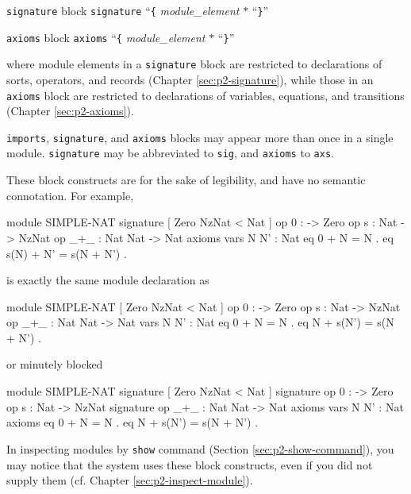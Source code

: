 \documentclass[a4paper]{memoir}
\begin{document}
\begin{bsyntax} \texttt{signature} block  \Hline
\texttt{signature} ``\texttt{\{} \textit{module\_element} $*$ ``\texttt{\}}''
\end{bsyntax}

\begin{bsyntax} \texttt{axioms} block  \Hline
\texttt{axioms} ``\texttt{\{} \textit{module\_element} $*$ ``\texttt{\}}''
\end{bsyntax}

where module elements in a \verb|signature| block
are restricted to declarations of sorts,
operators, and records (Chapter \ref{sec:p2-signature}),
while those in an \verb|axioms| block are restricted
to declarations of variables, equations, and transitions
(Chapter \ref{sec:p2-axioms}).

\verb|imports|,
\verb|signature|, and \verb|axioms| blocks may appear more than once in a
single module. \verb|signature| may be abbreviated to \verb|sig|, and
\verb|axioms| to \verb|axs|.

These block constructs are for the sake of
legibility, and have no semantic connotation. For example,
\label{exs:simple-nat}
\begin{vvtm}
\begin{ccode}
  module SIMPLE-NAT {
    signature {
      [ Zero NzNat < Nat ]
      op 0  : -> Zero
      op s : Nat -> NzNat 
      op _+_ : Nat Nat -> Nat
    }
    axioms {
      vars N N' : Nat
      eq 0 + N = N .
      eq s(N) + N' = s(N + N') .
    }  
  }
\end{ccode}
\end{vvtm}
is exactly the same module declaration as
\begin{vvtm}
\begin{ccode}
  module SIMPLE-NAT {
    [ Zero NzNat < Nat ]
    op 0  : -> Zero
    op s : Nat -> NzNat 
    op _+_ : Nat Nat -> Nat
    vars N N' : Nat
    eq 0 + N = N .
    eq N + s(N') = s(N + N') .
  }
\end{ccode}
\end{vvtm}
or minutely blocked
\begin{vvtm}
\begin{ccode}
    module SIMPLE-NAT {
    signature {
      [ Zero NzNat < Nat ]
    }
    signature {
      op 0  : -> Zero
      op s : Nat -> NzNat 
    }
    signature {
      op _+_ : Nat Nat -> Nat
    }  
    axioms {
      vars N N' : Nat
    }
    axioms {
      eq 0 + N = N .
      eq N + s(N') = s(N + N') .
    }
  }
\end{ccode}
\end{vvtm}
\begin{warning}
In inspecting modules by \verb|show| command
(Section \ref{sec:p2-show-command}),
you may notice that the system uses these block constructs,
even if you did not supply them (cf. Chapter \ref{sec:p2-inspect-module}).
\end{warning}
\end{document}
